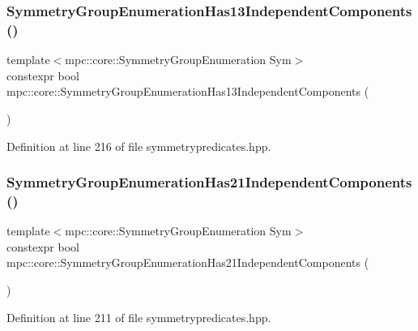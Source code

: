 \subsubsection{\texorpdfstring{Symmetry\+Group\+Enumeration\+Has13\+Independent\+Components()}{SymmetryGroupEnumerationHas13IndependentComponents()}}
{\footnotesize\ttfamily template$<$mpc\+::core\+::\+Symmetry\+Group\+Enumeration Sym$>$ \\
constexpr bool mpc\+::core\+::\+Symmetry\+Group\+Enumeration\+Has13\+Independent\+Components (\begin{DoxyParamCaption}{ }\end{DoxyParamCaption})\hspace{0.3cm}{\ttfamily [inline]}}



Definition at line 216 of file symmetrypredicates.\+hpp.

\mbox{\label{namespacempc_1_1core_a21ac1a6b1e3d110dfe48271ea0a94ca1}} 
\subsubsection{\texorpdfstring{Symmetry\+Group\+Enumeration\+Has21\+Independent\+Components()}{SymmetryGroupEnumerationHas21IndependentComponents()}}
{\footnotesize\ttfamily template$<$mpc\+::core\+::\+Symmetry\+Group\+Enumeration Sym$>$ \\
constexpr bool mpc\+::core\+::\+Symmetry\+Group\+Enumeration\+Has21\+Independent\+Components (\begin{DoxyParamCaption}{ }\end{DoxyParamCaption})\hspace{0.3cm}{\ttfamily [inline]}}



Definition at line 211 of file symmetrypredicates.\+hpp.

\mbox{\label{namespacempc_1_1core_abc0db530207961bd47fd1308595ae226}} 
